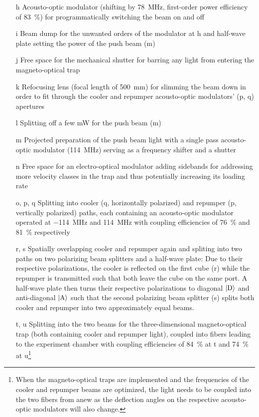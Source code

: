 \begin{itemize}
    \item[h] Acousto-optic modulator (shifting by \SI{+78}{\mega\hertz}, first-order power efficiency of \SI{83}{\percent}) for programmatically switching the beam on and off
    
    \item[i] Beam dump for the unwanted orders of the modulator at h and half-wave plate setting the power of the push beam (m)
    
    \item[j] Free space for the mechanical shutter for barring any light from entering the magneto-optical trap
    
    \item[k] Refocusing lens (focal length of \SI{500}{\milli\meter}) for slimming the beam down in order to fit through the cooler and repumper acousto-optic modulators' (p, q) apertures
    
    \item[l] Splitting off a few \si{\milli\watt} for the push beam (m)

    \item[m] Projected preparation  of the push beam light with a single pass acousto-optic modulator (\SI{+114}{\mega\hertz}) serving as a frequency shifter and a shutter
    
    \item[n] Free space for an electro-optical modulator adding sidebands for addressing more velocity classes in the trap and thus potentially increasing its loading rate
    
    \item[o, p, q] Splitting into cooler (q, horizontally polarized) and repumper (p, vertically polarized) paths, each containing an acousto-optic modulator operated at \SI{-114}{\mega\hertz} and \SI{+114}{\mega\hertz} with coupling efficiencies of \SI{76}{\percent} and \SI{81}{\percent} respectively
    
    \item[r, s] Spatially overlapping cooler and repumper again and spliting into two paths on two polarizing beam splitters and a half-wave plate: Due to their respective polarizations, the cooler is reflected on the first cube (r) while the repumper is transmitted such that both leave the cube on the same port. A half-wave plate then turns their respective polarizations to diagonal $\Ket{\text{D}}$ and anti-diagonal $\Ket{\text{A}}$ such that the second polarizing beam splitter (s) splits both cooler and repumper into two approximately equal beams.
    
    \item[t, u] Splitting into the two beams for the three-dimensional magneto-optical trap (both containing cooler and repumper light), coupled into fibers leading to the experiment chamber with coupling efficiencies of \SI{84}{\percent} at t and \SI{74}{\percent} at u\footnote{When the magneto-optical traps are implemented and the frequencies of the cooler and repumper beams are optimized, the light needs to be coupled into the two fibers from anew as the deflection angles on the respective acousto-optic modulators will also change.}
\end{itemize}

